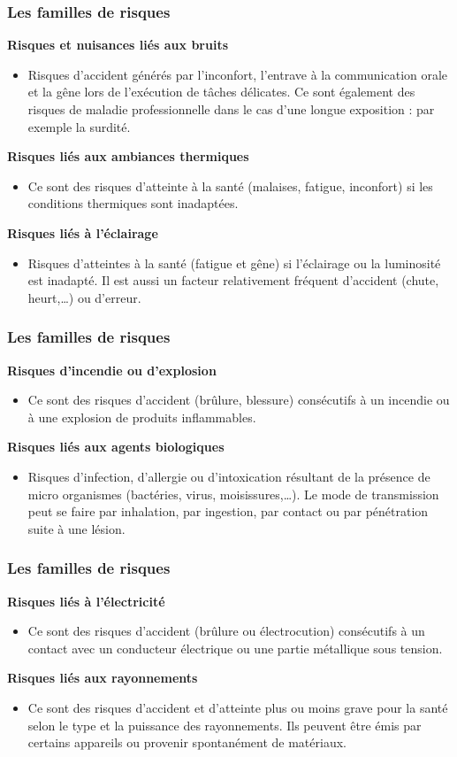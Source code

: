 \documentclass{beamer}
\begin{document}
\begin{frame}
\frametitle{Les familles de risques}
\textbf{Risques et nuisances liés aux bruits}
\begin{itemize}
\item  Risques d’accident générés par l’inconfort, l’entrave à la communication orale et la gêne lors de l’exécution de tâches délicates. Ce sont également des risques de maladie professionnelle dans le cas d’une longue exposition : par exemple la surdité.
\end{itemize}
\textbf{Risques liés aux ambiances thermiques}
\begin{itemize}
\item  Ce sont des risques d’atteinte à la santé (malaises, fatigue, inconfort) si les conditions thermiques sont inadaptées.
\end{itemize}
\textbf{Risques liés à l’éclairage}
\begin{itemize}
\item  Risques d’atteintes à la santé (fatigue et gêne) si l’éclairage ou la  luminosité est inadapté. Il est aussi un facteur relativement fréquent d’accident (chute, heurt,…) ou d’erreur.
\end{itemize}
\end{frame}

\begin{frame}
\frametitle{Les familles de risques}
\textbf{Risques d’incendie ou d’explosion}
\begin{itemize}
\item Ce sont des risques d’accident (brûlure, blessure) consécutifs à un incendie ou à une explosion de produits inflammables.
\end{itemize}
\textbf{Risques liés aux agents biologiques}
\begin{itemize}
\item Risques d’infection, d’allergie ou d’intoxication résultant de la présence de micro organismes (bactéries, virus, moisissures,…). Le mode de transmission peut se faire par inhalation, par ingestion, par contact ou par pénétration suite à une lésion.
\end{itemize}
\end{frame}

\begin{frame}
\frametitle{Les familles de risques}
\textbf{Risques liés à l’électricité}
\begin{itemize}
\item Ce sont des risques d’accident (brûlure ou électrocution) consécutifs à un contact avec un conducteur électrique ou une partie métallique sous tension.
\end{itemize}
\textbf{Risques liés aux rayonnements}
\begin{itemize}
\item Ce sont des risques d’accident et d’atteinte plus ou moins grave pour la santé selon le type et la puissance des rayonnements. Ils peuvent être émis par certains appareils ou provenir spontanément de matériaux.
\end{itemize}
\end{frame}
\end{document}
